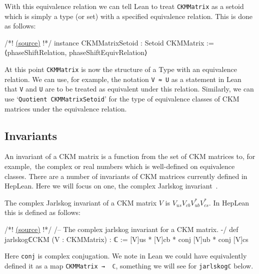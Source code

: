\documentclass[a4paper, 11pt]{article}
\newcommand{\codeLink}[1]{
  \vspace{-0.5cm}\hfill\href{https://github.com/HEPLean/HepLean/blob/1b951994ae3d882242b02d23957ef1ee7fa05f3d/HepLean/#1}{(source)}
  }
\begin{document}
With this equivalence relation we can tell Lean to treat \lstinline|CKMMatrix| as a setoid which is simply a type (or set) with a specified equivalence relation. This is done as follows:
\begin{code}
/*!\codeLink{FlavorPhysics/CKMMatrix/Basic.lean\#L152}!*/
instance CKMMatrixSetoid : Setoid CKMMatrix := 
    ⟨phaseShiftRelation, phaseShiftEquivRelation⟩
\end{code}
At this point  \lstinline|CKMMatrix| is now the structure of a Type with an equivalence relation. We can use, for example, the notation \lstinline|V ≈ U|  as a statement in Lean that \lstinline|V| and \lstinline|U| are to be treated as equivalent under this relation. Similarly, we can use `\lstinline|Quotient CKMMatrixSetoid|' for the type of equivalence classes of CKM matrices under the equivalence relation.



\subsection{Invariants}

An invariant of a CKM matrix is a function from the set of CKM matrices to, for example,\ the complex or real numbers which is well-defined on equivalence classes. There are a number of invariants of CKM matrices currently defined in HepLean. Here we will focus on one, the 
complex Jarlskog invariant~\cite{Jarlskog}. 

The complex Jarlskog invariant of a CKM matrix $V$ is $V_{us} V_{cb} V_{ub}^\ast V_{cs}^\ast$. In HepLean this is defined as follows: 
\begin{code}
/*!\codeLink{FlavorPhysics/CKMMatrix/Invariants.lean\#L31}!*/
/-- The complex jarlskog invariant for a CKM matrix. -/
def jarlskogℂCKM (V : CKMMatrix) : ℂ := [V]us * [V]cb * conj [V]ub * conj [V]cs
\end{code}
Here \lstinline|conj| is complex conjugation.  We note in Lean we could have equivalently defined it as a map \lstinline|CKMMatrix →  ℂ|, something we will see for \lstinline|jarlskogℂ| below. 
\end{document}
